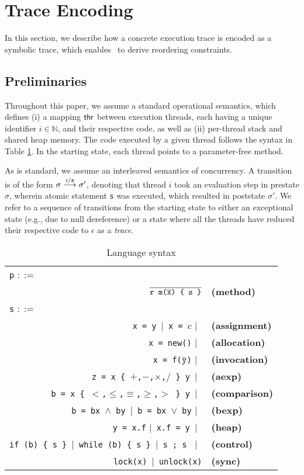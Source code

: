 \section{Trace Encoding}

In this section, we describe how a concrete execution trace is encoded as a symbolic trace, which enables \tool\ to 
derive reordering constraints.

\subsection{Preliminaries}

Throughout this paper, we assume a standard operational semantics, which defines (i) a mapping ${\sf thr}$ between
execution threads, each having a unique identifier $i \in \mathbb{N}$, and their respective code, as well as (ii) per-thread stack and shared heap memory. The code executed by a given thread follows the syntax in Table \ref{Ta:syntax}. In the starting state, each thread points to a parameter-free method.

As is standard, we assume an interleaved semantics of concurrency. A transition is of the form
$\sigma \stackrel{i / {\tt s}}{\longrightarrow} \sigma'$, denoting that thread $i$ took an evaluation step
in prestate $\sigma$, wherein atomic
statement {\tt s} was executed, which resulted in poststate $\sigma'$. We refer to a sequence of transitions from
the starting state to either an exceptional state (e.g., due to null dereference) or a state where all the threads have 
reduced their respective code to $\epsilon$ as a \emph{trace}.

\begin{table}
	\begin{center}
	\begin{tabular}{rl}
						\multicolumn{1}{l}{{\tt p} $::=$} & \\
					    $\overline{\texttt{r m($\overline{{\tt x}}$) \{ s \}}}$ & {\bf (method)} \\
						\multicolumn{1}{l}{{\tt s} $::=$} & \\
						{\tt x = y}\ $|$\ {\tt x = $c$} $|$\ & {\bf (assignment)} \\
						{\tt x = new()} $|$\ & {\bf (allocation)} \\
						{\tt x = f($\overline{{\tt y}}$)} $|$\ & {\bf (invocation)} \\
						{\tt z = x \{ $+$,$-$,$\times$,$/$ \} y}\ $|$\ & {\bf (aexp)} \\
						{\tt b = x \{ $<$,$\leq$,$\equiv$,$\geq$,$>$ \} y}\ $|$\ & {\bf (comparison)} \\
						{\tt b = bx $\wedge$ by}\ $|$\ {\tt b = bx $\vee$ by} $|$\ & {\bf (bexp)} \\
						{\tt y = x.f} $|$\ {\tt x.f = y}\ $|$\ & {\bf (heap)} \\
						{\tt if (b) \{ s \} $|$\ {\tt while (b) \{  s \}} $|$\ {\tt s ; s }} $|$\ & {\bf (control)} \\
						{\tt lock(x)}\ $|$\ {\tt unlock(x)} & {\bf (sync)}
	\end{tabular}
	\end{center}
	\caption{\label{Ta:syntax}Language syntax}
\end{table}

